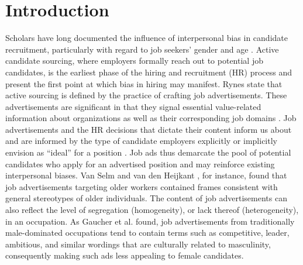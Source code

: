\documentclass[Royal,sageapa,times]{sagej}
\begin{document}
\section{Introduction\label{introduction}}
Scholars have long documented the influence of interpersonal bias in candidate recruitment, particularly with regard to job seekers’ gender and age . Active candidate sourcing, where employers formally reach out to potential job candidates, is the earliest phase of the hiring and recruitment (HR) process and present the first point at which bias in hiring may manifest. Rynes  state that active sourcing is defined by the practice of crafting job advertisements. These advertisements are significant in that they signal essential value-related information about organizations as well as their corresponding job domains . Job advertisements and the HR decisions that dictate their content inform us about and are informed by the type of candidate employers explicitly or implicitly envision as “ideal” for a position . Job ads thus demarcate the pool of potential candidates who apply for an advertised position and may reinforce existing interpersonal biases. Van Selm and van den Heijkant \citeyear{vanselmSearchOlderWorker2021}, for instance, found that job advertisements targeting older workers contained frames consistent with general stereotypes of older individuals. The content of job advertisements can also reflect the level of segregation (homogeneity), or lack thereof (heterogeneity), in an occupation. As Gaucher et al. \citeyear{Gaucher2011} found, job advertisements from traditionally male-dominated occupations tend to contain terms such as competitive, leader, ambitious, and similar wordings that are culturally related to masculinity, consequently making such ads less appealing to female candidates.
\end{document}
